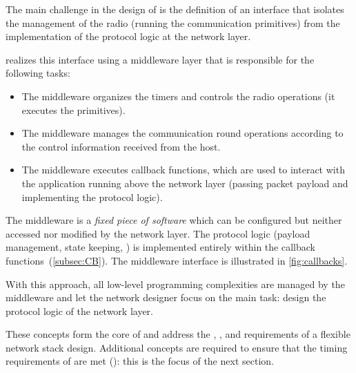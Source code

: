 The main challenge in the design of \baloo is the definition of an interface that isolates the management of the radio (\ie running the \ST communication primitives) from the implementation of the protocol logic at the network layer.
%
{
\setlength{\parskip}{3pt}%
\setlength{\parsep}{3pt}%
\baloo realizes this interface using a middleware layer that is responsible for the following tasks:
\begin{itemize}

	\item The middleware organizes the timers and controls the radio operations (\ie it executes the \ST primitives).

	\item The middleware manages the communication round operations according to the control information received from the host.

	\item The middleware executes callback functions, which are used to interact with the application running above the network layer (\ie passing packet payload and implementing the protocol logic).

\end{itemize}
The middleware is a \textsl{fixed piece of software} which can be configured but neither accessed nor modified by the network layer.
The protocol logic (payload management, state keeping, \etc) is implemented entirely within the callback functions~(\cref{subsec:CB}).%
The middleware interface is illustrated in \cref{fig:callbacks}.%
}

With this approach, all low-level programming complexities are managed by the middleware and let the network designer focus on the main task: design the protocol logic of the network layer.

These concepts form the core of \baloo and address the , ,  and  requirements of a flexible network stack design.
Additional concepts are required to ensure that the timing requirements of \ST are met (): this is the focus of the next section.
